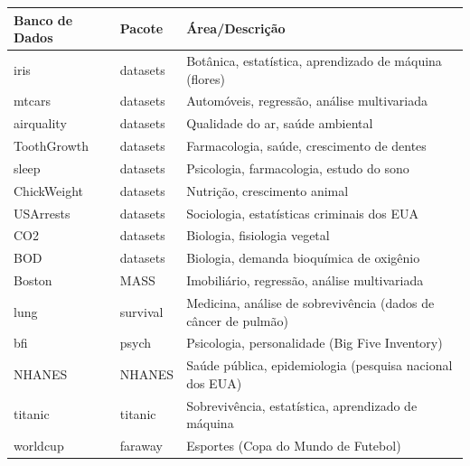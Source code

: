 \documentclass[
]{book}
\newcounter{none} %
\begin{document}
{\def\LTcaptype{none} %
\begin{longtable}[]{@{}
  >{\raggedright\arraybackslash}p{}
  >{\raggedright\arraybackslash}p{}
  >{\raggedright\arraybackslash}p{}@{}}
\toprule\noalign{}
\begin{minipage}[b]{\linewidth}\raggedright
Banco de Dados
\end{minipage} & \begin{minipage}[b]{\linewidth}\raggedright
Pacote
\end{minipage} & \begin{minipage}[b]{\linewidth}\raggedright
Área/Descrição
\end{minipage} \\
\midrule\noalign{}
\endhead
\bottomrule\noalign{}
\endlastfoot
iris & datasets & Botânica, estatística, aprendizado de máquina (flores) \\
mtcars & datasets & Automóveis, regressão, análise multivariada \\
airquality & datasets & Qualidade do ar, saúde ambiental \\
ToothGrowth & datasets & Farmacologia, saúde, crescimento de dentes \\
sleep & datasets & Psicologia, farmacologia, estudo do sono \\
ChickWeight & datasets & Nutrição, crescimento animal \\
USArrests & datasets & Sociologia, estatísticas criminais dos EUA \\
CO2 & datasets & Biologia, fisiologia vegetal \\
BOD & datasets & Biologia, demanda bioquímica de oxigênio \\
Boston & MASS & Imobiliário, regressão, análise multivariada \\
lung & survival & Medicina, análise de sobrevivência (dados de câncer de pulmão) \\
bfi & psych & Psicologia, personalidade (Big Five Inventory) \\
NHANES & NHANES & Saúde pública, epidemiologia (pesquisa nacional dos EUA) \\
titanic & titanic & Sobrevivência, estatística, aprendizado de máquina \\
worldcup & faraway & Esportes (Copa do Mundo de Futebol) \\
\end{longtable}
}
\end{document}
